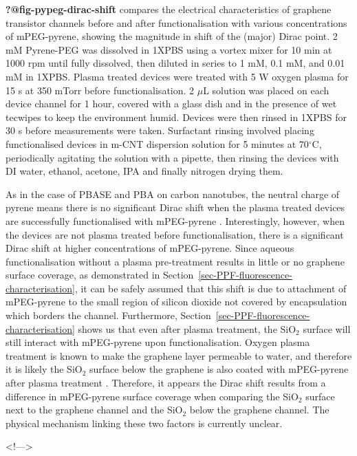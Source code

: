 \documentclass[
  a4paper,
]{scrbook}
\begin{document}
\textbf{?@fig-pypeg-dirac-shift} compares the electrical characteristics
of graphene transistor channels before and after functionalisation with
various concentrations of mPEG-pyrene, showing the magnitude in shift of
the (major) Dirac point. 2 mM Pyrene-PEG was dissolved in 1XPBS using a
vortex mixer for 10 min at 1000 rpm until fully dissolved, then diluted
in series to 1 mM, 0.1 mM, and 0.01 mM in 1XPBS. Plasma treated devices
were treated with 5 W oxygen plasma for 15 s at 350 mTorr before
functionalisation. 2 \(\mu\)L solution was placed on each device channel
for 1 hour, covered with a glass dish and in the presence of wet
tecwipes to keep the environment humid. Devices were then rinsed in
1XPBS for 30 s before measurements were taken. Surfactant rinsing
involved placing functionalised devices in m-CNT dispersion solution for
5 minutes at 70\(^\circ\)C, periodically agitating the solution with a
pipette, then rinsing the devices with DI water, ethanol, acetone, IPA
and finally nitrogen drying them.

As in the case of PBASE and PBA on carbon nanotubes, the neutral charge
of pyrene means there is no significant Dirac shift when the plasma
treated devices are successfully functionalised with mPEG-pyrene
\autocite{Lerner2012}. Interestingly, however, when the devices are not
plasma treated before functionalisation, there is a significant Dirac
shift at higher concentrations of mPEG-pyrene. Since aqueous
functionalisation without a plasma pre-treatment results in little or no
graphene surface coverage, as demonstrated in
Section~\ref{sec-PPF-fluorescence-characterisation}, it can be safely
assumed that this shift is due to attachment of mPEG-pyrene to the small
region of silicon dioxide not covered by encapsulation which borders the
channel. Furthermore,
Section~\ref{sec-PPF-fluorescence-characterisation} shows us that even
after plasma treatment, the SiO\(_2\) surface will still interact with
mPEG-pyrene upon functionalisation. Oxygen plasma treatment is known to
make the graphene layer permeable to water, and therefore it is likely
the SiO\(_2\) surface below the graphene is also coated with mPEG-pyrene
after plasma treatment \autocite{Surwade2015}. Therefore, it appears the
Dirac shift results from a difference in mPEG-pyrene surface coverage
when comparing the SiO\(_2\) surface next to the graphene channel and
the SiO\(_2\) below the graphene channel. The physical mechanism linking
these two factors is currently unclear.

\textless!---\textgreater{}
\end{document}
